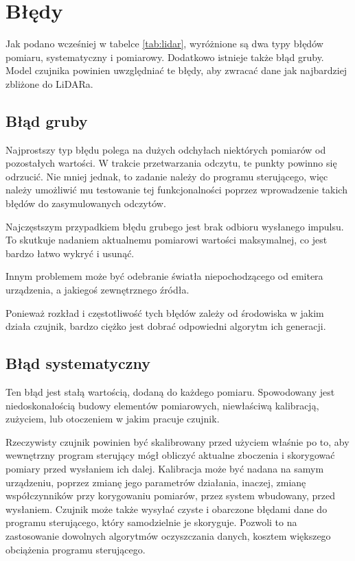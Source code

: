 \section{Błędy}
	Jak podano wcześniej w tabelce \ref{tab:lidar}, wyróżnione są dwa typy błędów pomiaru, systematyczny i pomiarowy.
	Dodatkowo istnieje także błąd gruby.
	Model czujnika powinien uwzględniać te błędy, aby zwracać dane jak najbardziej zbliżone do LiDARa.

	\subsection{Błąd gruby}
		Najprostszy typ błędu polega na dużych odchyłach niektórych pomiarów od pozostałych wartości.
		W trakcie przetwarzania odczytu, te punkty powinno się odrzucić.
		Nie mniej jednak, to zadanie należy do programu sterującego, więc należy umożliwić mu testowanie tej funkcjonalności poprzez wprowadzenie takich błędów do zasymulowanych odczytów.

		Najczęstszym przypadkiem błędu grubego jest brak odbioru wysłanego impulsu. 
		To skutkuje nadaniem aktualnemu pomiarowi wartości maksymalnej, co jest bardzo łatwo wykryć i usunąć.

		Innym problemem może być odebranie światła niepochodzącego od emitera urządzenia, a jakiegoś zewnętrznego źródła.

		Ponieważ rozkład i częstotliwość tych błędów zależy od środowiska w jakim działa czujnik, bardzo ciężko jest dobrać odpowiedni algorytm ich generacji.

	\subsection{Błąd systematyczny}
		Ten błąd jest stałą wartością, dodaną do każdego pomiaru.
		Spowodowany jest niedoskonałością budowy elementów pomiarowych, niewłaściwą kalibracją, zużyciem, lub otoczeniem w jakim pracuje czujnik.

		Rzeczywisty czujnik powinien być skalibrowany przed użyciem właśnie po to, aby wewnętrzny program sterujący mógł obliczyć aktualne zboczenia 
		i skorygować pomiary przed wysłaniem ich dalej. Kalibracja może być nadana na samym urządzeniu, poprzez zmianę jego parametrów działania,
		inaczej, zmianę współczynników przy korygowaniu pomiarów, przez system wbudowany, przed wysłaniem.
		Czujnik może także wysyłać czyste i obarczone błędami dane do programu sterującego, który samodzielnie je skoryguje.
		Pozwoli to na zastosowanie dowolnych algorytmów oczyszczania danych, kosztem większego obciążenia programu sterującego.

